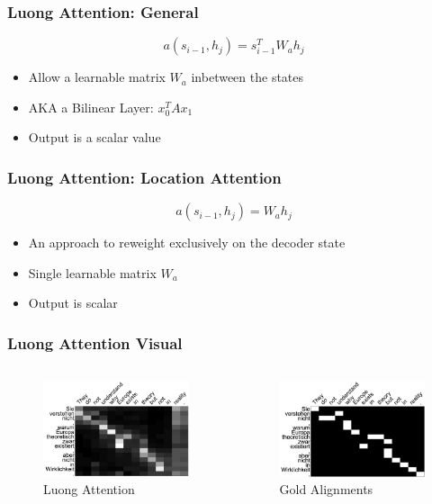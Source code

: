 \documentclass[usenames,dvipsnames]{beamer}
\begin{document}
\begin{frame}
\frametitle{Luong Attention: General}
\begin{equation*}
  a\left( s_{i-1}, h_j \right) = s_{i-1}^T W_a h_j
\end{equation*}
\begin{itemize}
  \item Allow a learnable matrix $W_a$ inbetween the states
  \item AKA a Bilinear Layer: $x_0^T A x_1$
  \item Output is a scalar value
\end{itemize}
\end{frame}

\begin{frame}
\frametitle{Luong Attention: Location Attention}
\begin{equation*}
  a\left( s_{i-1}, h_j \right) = W_a h_j
\end{equation*}
\begin{itemize}
  \item An approach to reweight exclusively on the decoder state
  \item Single learnable matrix $W_a$
  \item Output is scalar
\end{itemize}
\end{frame}


\begin{frame}
  \frametitle{Luong Attention Visual}
  \begin{columns}
  \begin{column}{0.45\textwidth}
  \begin{figure}
    \includegraphics[width=5cm]{assets/global}
    \caption{Luong Attention}
  \end{figure}
\end{column}
\begin{column}{0.45\textwidth}
  \begin{figure}
    \includegraphics[width=5cm]{assets/gold}
    \caption{Gold Alignments}
  \end{figure}
\end{column}
  \end{columns}
\end{frame}
\end{document}
